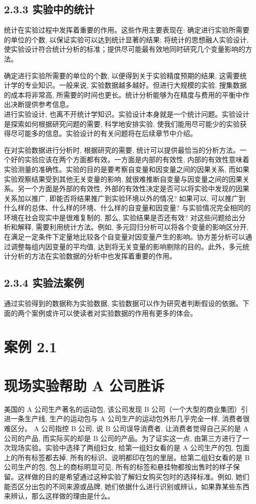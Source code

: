 \documentclass[10pt]{article}
\begin{document}
\begin{CJK*}{UTF8}{bsmi}
\subsection*{2.3.3 实验中的统计}
统计在实验过程中发挥着重要的作用。这些作用主要表现在: 确定进行实验所需要的单位的个数, 以保证实验可以达到统计显著的结果; 将统计的思想融人实验设计, 使实验设计符合统计分析的标准；提供尽可能最有效地同时研究几个变量影响的方法。

确定进行实验所需要的单位的个数, 以便得到关于实验精度预期的结果, 这需要统计学的专业知识。一般来说, 实验数据越多越好。但进行大规模的实验, 搜集数据的成本将非常高, 所需要的时间也更长。统计分析能够为在精度与费用的平衡中作出决断提供参考信息。\\
进行实验设计, 也离不开统计学知识。实验设计本身就是一个统计问题。实验设计是探索如何根据研究问题的需要, 科学地安排实验, 使我们能用尽可能少的实验获得尽可能多的信息。实验设计的有关问题将在后续章节中介绍。

在对实验数据进行分析时, 根据研究的需要, 统计可以提供最恰当的分析方法。一个好的实验应该在两个方面都有效。一方面是内部的有效性, 内部的有效性意味着实验测量的准确性。实验的目的是要考察自变量和因变量之间的因果关系, 而如果实验观察结果受到其他无关变量的影响, 就很难推断自变量与因变量之间的因果关系。另一个方面是外部的有效性, 外部的有效性决定是否可以将实验中发现的因果关系加以推广, 即能否将结果推广到实验环境以外的情况? 如果可以, 可以推广到什么样的总体、什么样的环境、什么样的自变量和因变量? 与实验情况完全相同的环境在社会现实中是很难复制的, 那么, 实验结果是否还有效? 对这些问题给出分析和解释, 需要利用统计方法。例如, 多元回归分析可以将各个变量的影响区分开, 在满足一定条件下定量地比较各个自变量对因变量产生的影响。协方差分析可以通过调整每组内因变量的平均值, 达到将无关变量的影响剔除的目的。此外，多元统计分析的方法在实验数据的分析中也发挥着重要的作用。

\subsection*{2.3.4 实验法案例}
通过实验得到的数据称为实验数据, 实验数据可以作为研究者判断假设的依据。下面的两个案例或许可以使读者对实验数据的作用有更多的体会。

\section*{案例 2.1}
\section*{现场实验帮助 A 公司胜诉}
美国的 A 公司生产著名的运动包, 该公司发现 B 公司（一个大型的商业集团）引进一条生产线, 生产的运动包与 A 公司生产的运动包外形几乎完全一样, 消费者很难区分。 $\mathrm{A}$ 公司指控 B 公司, 说 B 公司误导消费者, 让消费者觉得自己买的是 A 公司的产品, 而实际买的却是 $\mathrm{B}$ 公司的产品。为了证实这一点, 由第三方进行了一次现场实验。实验中选择了两组妇女, 给第一组妇女看的是 A 公司生产的包, 包面上的所有标签都去掉, 所有的标识、说明都印在包的里层。给第二组妇女看的是 B 公司生产的包, 包上的商标明显可见, 所有的标签和悬挂物都按出售时的样子保留。这样做的目的是希望通过这种实验了解妇女购买包时的选择标准。例如, 她们能否区分出包的不同来源或品牌, 她们依据什么进行识别或辨认，如果靠某些东西来辨认，那么这样做的理由是什么。


\end{CJK*}
\end{document}
